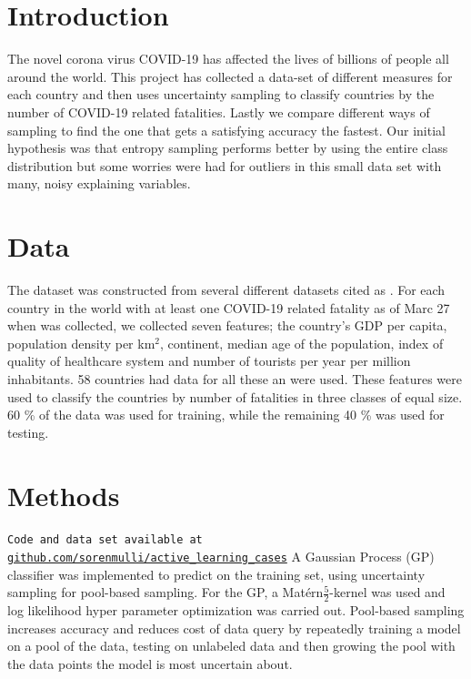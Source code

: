 \documentclass[12pt,fleqn]{article}
\begin{document}
\begin{multicols}{2}
	
	
	\section{Introduction} %
	The novel corona virus COVID-19 has affected the lives of billions of people all around the world. This project has collected a data-set of different measures for each country and then uses uncertainty sampling to classify countries by the number of COVID-19 related fatalities. Lastly we compare different ways of sampling to find the one that gets a satisfying accuracy the fastest. Our initial hypothesis was that entropy sampling performs better by using the entire class distribution but some worries were had for outliers in this small data set with many, noisy explaining variables. 
	
	\section{Data}
	The dataset was constructed from several different datasets cited as \cite{density, corona, alder, bnp, region, healthcare, turist}. For each country in the world with at least one COVID-19 related fatality as of Marc 27 when \cite{corona} was collected, we collected seven features; the country's GDP per capita, population density per km$^2$, continent, median age of the population, index of quality of healthcare system and number of tourists per year per million inhabitants. 58 countries had data for all these an were used. These features were used to classify the countries by number of fatalities in three classes of equal size. 60 \% of the data was used for training, while the remaining 40 \% was used for testing. %

	\section{Methods}
	\texttt{Code and data set available at \url{github.com/sorenmulli/active_learning_cases}} \newline
	A Gaussian Process (GP) classifier was implemented to predict on the training set, using uncertainty sampling for pool-based sampling. For the GP, a Matérn$\frac{5}{2}$-kernel was used and log likelihood hyper parameter optimization was carried out. Pool-based sampling increases accuracy and reduces cost of data query by repeatedly training a model on a pool of the data, testing on unlabeled data and then growing the pool with the data points the model is most uncertain about. 


\end{multicols}
\end{document}
